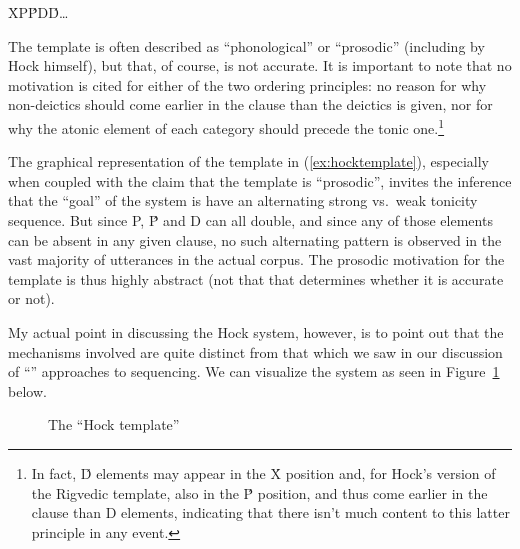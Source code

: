 \documentclass[output=paper,
modfonts
]{LSP/langsci}
\begin{document}
\begin{exe}
	\ex\label{ex:hocktemplate}\'{X}\hspace{.25in}P\hspace{.25in}\'{P}\hspace{.25in}D\hspace{.25in}\'{D}\hspace{.25in}\ldots\
\end{exe}

\noindent The template is often described as ``phonological''
or ``prosodic'' (including by Hock himself), but that, of course, is not accurate. It is important to note that no motivation is cited for either of the two ordering
principles: no reason for why non-deictics should come earlier in the clause than the deictics
is given, nor for why the atonic element of each category should precede the tonic one.\footnote{In fact,
\'{D} elements may appear in the \'{X} position and, for Hock's version of the Rigvedic\is{Rigveda} template,
also in the \'{P} position, and thus come earlier in the clause than D elements,
indicating that there isn't much content to this latter principle in
any event.}

The graphical representation of the template in (\ref{ex:hocktemplate}), especially when coupled with the
claim that the template is ``prosodic'', invites the inference that the ``goal'' of the system is have an alternating
strong vs.\ weak tonicity sequence. But since P, \'{P} and D can all double, and since any of those elements can
be absent in any given clause, no such alternating pattern is observed in the vast majority of utterances
in the actual corpus. The prosodic motivation for the template is thus highly abstract (not that that determines
whether it is accurate or not).

My actual point in discussing the Hock system, however, is to point out that the mechanisms involved are quite distinct from that which we saw in
our discussion of ``\isi{clitic cluster}'' approaches to \isi{clitic} sequencing. We can visualize the system as
seen in Figure~\ref{Halefigure2} below.%

\begin{figure}%
\begin{center}
\end{center}
\caption{The ``Hock template''}\label{Halefigure2}
\end{figure}
\end{document}
